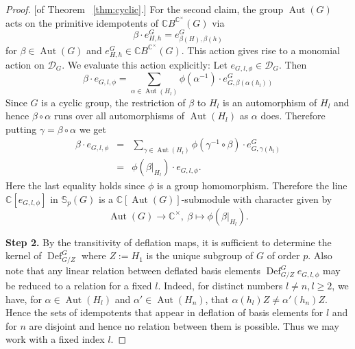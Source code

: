 \documentclass[12pt]{article}
\theoremstyle{plain}
\theoremstyle{definition}
\newcommand{\kerlin}{\mathbb S_p}
\newcommand{\MonG}{\mathbb C B^{\mathbb C^\times}(G)}
\newcommand{\defl}{\operatorname{Def}}
\newcommand{\Aut}{\operatorname{Aut}}
\begin{document}
\begin{proof}{[of Theorem ~\ref{thm:cyclic}.]}
For the second claim, the group $\Aut(G)$ acts on the primitive idempotents of $\MonG$ via
\[
\beta\cdot e_{H, h}^G = e_{\beta(H), \beta(h)}^G
\]
for $\beta\in\Aut(G)$ and $e_{H, h}^G\in \MonG$. This action gives rise to a monomial action on $\mathcal{D}_G$. We evaluate this action explicitly: Let $e_{G, l, \phi}\in \mathcal{D}_G$. Then
\[
\beta\cdot e_{G, l, \phi} = \sum_{\alpha\in\Aut(H_l)} \phi(\alpha^{-1})\cdot e_{G, \beta(\alpha(h_l))}^G
\]
Since $G$ is a cyclic group, the restriction of $\beta$ to $H_l$ is an automorphism of $H_l$ and hence $\beta\circ \alpha$ runs over all automorphisms of $\Aut(H_l)$ as $\alpha$ does. Therefore putting $\gamma = \beta\circ \alpha$ we get
\begin{eqnarray*}
\beta\cdot e_{G, l, \phi} &=& \sum_{\gamma\in\Aut(H_l)} \phi(\gamma^{-1}\circ \beta)\cdot e_{G, \gamma(h_l)}^G\\
&=& \phi(\beta|_{H_l}) \cdot e_{G, l, \phi}.
\end{eqnarray*}
Here the last equality holds since $\phi$ is a group homomorphism. Therefore the line $\mathbb C[e_{G, l, \phi}]$ in $\kerlin(G)$ is a $\mathbb C[\Aut(G)]$-submodule with character given by
\begin{equation}\label{eqn:phistar}
\Aut(G)\to \mathbb C^\times,\ \beta\mapsto \phi(\beta|_{H_l}).
\end{equation}

\smallskip
\noindent\textbf{Step 2.} By the transitivity of deflation maps, it is sufficient to determine the kernel of $\defl^G_{G/Z}$ where $Z:= H_1$ is the unique subgroup of $G$ of order $p$. Also note that any linear relation between deflated basis elements $\defl^G_{G/Z}e_{G, l, \phi}$ may be reduced to a relation for a fixed $l$. Indeed, for distinct numbers $l\not = n, l\ge 2$, we have, for $\alpha\in \Aut(H_l)$ and $\alpha'\in\Aut(H_n)$, that $\alpha(h_l)Z\not = \alpha'(h_n)Z$. Hence the sets of idempotents that appear in deflation of basis elements for $l$ and for $n$ are disjoint and hence no relation between them is possible. Thus we may work with a fixed index $l$.


\end{proof}
\end{document}
